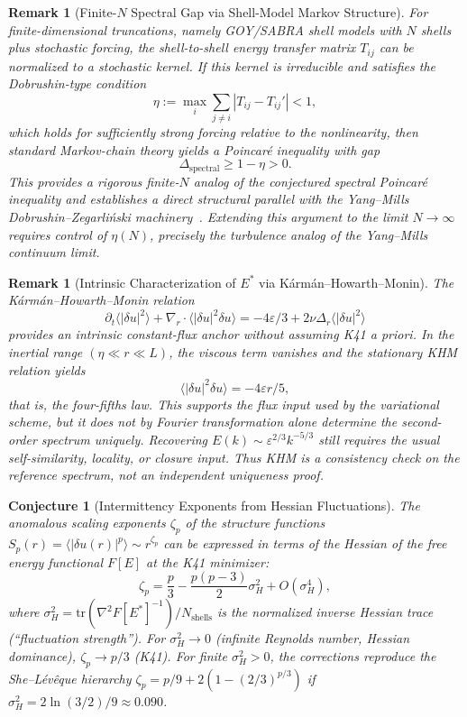 \documentclass[12pt,a4paper]{article}
\theoremstyle{breakdef}
\theoremstyle{breakplain}
\newtheorem{conjecture}[definition]{Conjecture}
\theoremstyle{breakdef}
\newtheorem{remark}[definition]{Remark}
\begin{document}
\begin{remark}[Finite-$N$ Spectral Gap via Shell-Model Markov Structure]\label{rem:finite-N-gap}
For finite-dimensional truncations, namely GOY/SABRA shell models with
$N$ shells plus stochastic forcing, the shell-to-shell energy transfer
matrix $T_{ij}$ can be normalized to a stochastic kernel. If this kernel
is irreducible and satisfies the Dobrushin-type condition
\[
  \eta := \max_i \sum_{j \neq i} |T_{ij} - T_{ij}'| < 1,
\]
which holds for sufficiently strong forcing relative to the nonlinearity,
then standard Markov-chain theory yields a Poincaré inequality with
gap
\[
  \Delta_{\mathrm{spectral}} \ge 1 - \eta > 0.
\]
This provides a rigorous finite-$N$ analog of the conjectured spectral
Poincaré inequality and establishes a direct structural parallel with
the Yang--Mills Dobrushin--Zegarli\'nski machinery~\cite{Geiger2026-YM}. Extending this argument to the limit
$N \to \infty$ requires control of $\eta(N)$, precisely the turbulence
analog of the Yang--Mills continuum limit.
\end{remark}

\begin{remark}[Intrinsic Characterization of $E^*$ via Kármán--Howarth--Monin]
\label{rem:khm-intrinsic}
The Kármán--Howarth--Monin relation
\[
  \partial_t \langle |\delta u|^2 \rangle
  + \nabla_r \cdot \langle |\delta u|^2 \delta u \rangle
  = -4\varepsilon/3 + 2\nu \Delta_r \langle |\delta u|^2 \rangle
\]
provides an intrinsic constant-flux anchor without assuming K41
\emph{a priori}. In the inertial range $(\eta \ll r \ll L)$, the viscous
term vanishes and the stationary KHM relation yields
\[
  \langle |\delta u|^2 \delta u \rangle = -4\varepsilon r / 5,
\]
that is, the four-fifths law. This supports the flux input used by the
variational scheme, but it does not by Fourier transformation alone
determine the second-order spectrum uniquely. Recovering
$E(k)\sim \varepsilon^{2/3}k^{-5/3}$ still requires the usual
self-similarity, locality, or closure input. Thus KHM is a consistency
check on the reference spectrum, not an independent uniqueness proof.
\end{remark}

\begin{conjecture}[Intermittency Exponents from Hessian Fluctuations]
\label{conj:intermittency-hessian}
The anomalous scaling exponents $\zeta_p$ of the structure functions $S_p(r) = \langle |\delta u(r)|^p \rangle \sim r^{\zeta_p}$ can be expressed in terms of the Hessian of the free energy functional $F[E]$ at the K41 minimizer:
\[
\zeta_p = \frac{p}{3} - \frac{p(p-3)}{2} \sigma_H^2 + O(\sigma_H^4),
\]
where $\sigma_H^2 = \mathrm{tr}(\nabla^2 F[E^*]^{-1}) / N_{\mathrm{shells}}$ is the normalized inverse Hessian trace (``fluctuation strength''). For $\sigma_H^2 \to 0$ (infinite Reynolds number, Hessian dominance), $\zeta_p \to p/3$ (K41). For finite $\sigma_H^2 > 0$, the corrections reproduce the She--Lévêque hierarchy $\zeta_p = p/9 + 2(1 - (2/3)^{p/3})$ if $\sigma_H^2 = 2\ln(3/2)/9 \approx 0.090$.
\end{conjecture}
\end{document}
